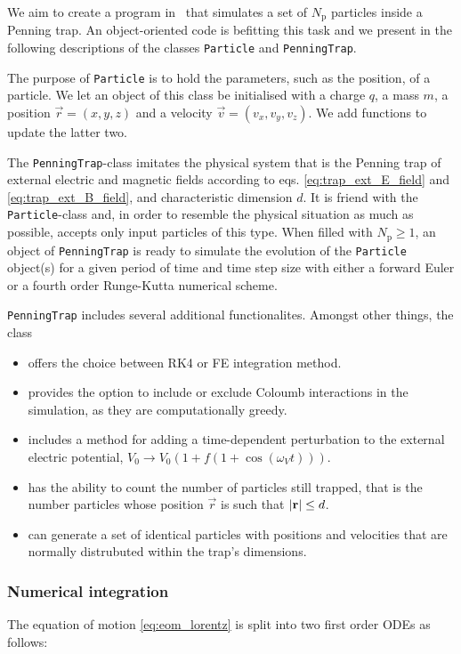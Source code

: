 We aim to create a program in \CC\, that simulates a set of $N_\mathrm{p}$ particles inside a Penning trap. An object-oriented code is befitting this task and we present in the following descriptions of the classes \verb|Particle| and \verb|PenningTrap|.

The purpose of \texttt{Particle} is to hold the parameters, such as the position, of a particle. We let an object of this class be initialised with a charge $q$, a mass $m$, a position $\vec{r} = (x,y,z)$ and a velocity $\vec{v} = (v_x, v_y, v_z)$. We add functions to update the latter two. 

The \texttt{PenningTrap}-class imitates the physical system that is the Penning trap of external electric and magnetic fields according to eqs. \eqref{eq:trap_ext_E_field} and \eqref{eq:trap_ext_B_field}, and characteristic dimension $d$. It is friend with the \texttt{Particle}-class and, in order to resemble the physical situation as much as possible, accepts only input particles of this type. When filled with $N_\mathrm{p}\geq 1$, an object of \texttt{PenningTrap} is ready to simulate the evolution of the \texttt{Particle} object(s) for a given period of time and time step size with either a forward Euler or a fourth order Runge-Kutta numerical scheme. 


\texttt{PenningTrap} includes several additional functionalites. Amongst other things, the class

\begin{itemize}
    \item offers the choice between RK4 or FE integration method.
    \item provides the option to include or exclude Coloumb interactions in the simulation, as they are computationally greedy.
    \item includes a method for adding a time-dependent perturbation to the external electric potential, $V_0\rightarrow V_0 (1+ f(1+\cos{(\omega_V t)}))$.
    \item has the ability to count the number of particles still trapped, that is the number particles whose position $\vec{r}$ is such that $\abs{\mathbf{r}} \leq d$.
    \item can generate a set of identical particles with positions and velocities that are normally distrubuted within the trap's dimensions.
\end{itemize}

\subsubsection*{Numerical integration}
The equation of motion \eqref{eq:eom_lorentz} is split into two first order ODEs as follows:

